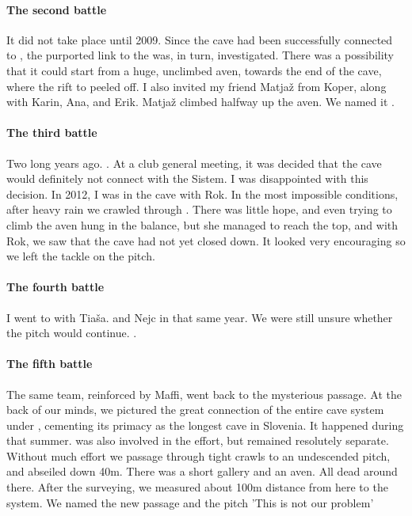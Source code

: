 \paragraph{The second battle} It did not take place until 2009. Since the cave had been successfully connected to , the purported link to the  was, in turn, investigated. There was a possibility that it could start from a huge, unclimbed aven, towards the end of the cave, where the rift to  peeled off. I also invited my friend Matjaž from Koper, along with Karin, Ana, and Erik. Matjaž climbed halfway up the aven. We named it .


\paragraph {The third battle} Two long years ago. . At a club general meeting, it was decided that the cave would definitely not connect with the Sistem.  I was disappointed with this decision. In 2012, I was in the cave with Rok.  In the most impossible conditions, after heavy rain we crawled through . There was little hope, and even trying to climb the aven hung in the balance, but she managed to reach the top, and with Rok, we saw that the cave had not yet closed down. It looked very encouraging so we left the tackle on the pitch.


 \paragraph {The fourth battle} I went to  with Tia{\v{s}}a. and Nejc in that same year. We were still unsure whether the pitch would continue. .


\paragraph {The fifth battle}  The same team, reinforced by Maffi, went back to the mysterious passage. At the back of our minds, we pictured the great connection of the entire cave system under , cementing its primacy as the longest cave in Slovenia. It happened during that summer.  was also involved in the effort, but remained resolutely separate. Without much effort we passage through tight crawls to an undescended pitch, and abseiled down 40m. There was a short gallery and an aven. All dead around there. After the surveying, we measured about 100m distance from here to the system. We named the new passage and the pitch 'This is not our problem' 

